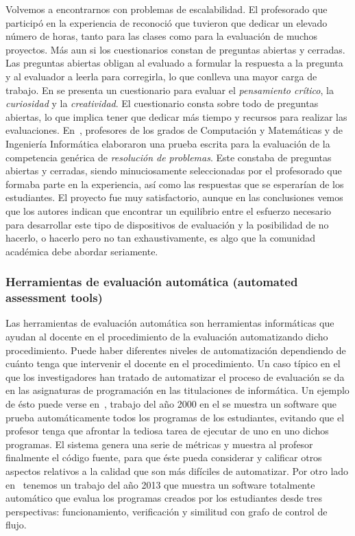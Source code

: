 Volvemos a encontrarnos con problemas de escalabilidad. El profesorado que participó en la experiencia de \cite{barbera2011design} reconoció que tuvieron que dedicar un elevado número de horas, tanto para las clases como para la evaluación de muchos proyectos. Más aun si los cuestionarios constan de preguntas abiertas y cerradas. Las preguntas abiertas obligan al evaluado a formular la respuesta a la pregunta y al evaluador a leerla para corregirla, lo que conlleva una mayor carga de trabajo. En \cite{albergaria2011critical} se presenta un cuestionario para evaluar el \emph{pensamiento crítico}, la \emph{curiosidad} y la \emph{creatividad}. El cuestionario consta sobre todo de preguntas abiertas, lo que implica tener que dedicar más tiempo y recursos para realizar las evaluaciones. En~\cite{vizcarro2013assessment}, profesores de los grados de Computación y Matemáticas y de Ingeniería Informática elaboraron una prueba escrita para la evaluación de la competencia genérica de \emph{resolución de problemas}. Este constaba de preguntas abiertas y cerradas, siendo minuciosamente seleccionadas por el profesorado que formaba parte en la experiencia, así como las respuestas que se esperarían de los estudiantes. El proyecto fue muy satisfactorio, aunque en las conclusiones vemos que los autores indican que encontrar un equilibrio entre el esfuerzo necesario para desarrollar este tipo de dispositivos de evaluación y la posibilidad de no hacerlo, o hacerlo pero no tan exhaustivamente, es algo que la comunidad académica debe abordar seriamente.




\subsubsection{Herramientas de evaluación automática (automated assessment tools)}

Las herramientas de evaluación automática son herramientas informáticas que ayudan al docente en el procedimiento de la evaluación automatizando dicho procedimiento. Puede haber diferentes niveles de automatización dependiendo de cuánto tenga que intervenir el docente en el procedimiento. Un caso típico en el que los investigadores han tratado de automatizar el proceso de evaluación se da en las asignaturas de programación en las titulaciones de informática. Un ejemplo de ésto puede verse en~\cite{jackson2000semi}, trabajo del año 2000 en el se muestra un software que prueba automáticamente todos los programas de los estudiantes, evitando que el profesor tenga que afrontar la tediosa tarea de ejecutar de uno en uno dichos programas. El sistema genera una serie de métricas y muestra al profesor finalmente el código fuente, para que éste pueda considerar y calificar otros aspectos relativos a la calidad que son más difíciles de automatizar. Por otro lado en~\cite{vujovsevic2013software} tenemos un trabajo del año 2013 que muestra un software totalmente automático que evalua los programas creados por los estudiantes desde tres perspectivas: funcionamiento, verificación y similitud con grafo de control de flujo.

